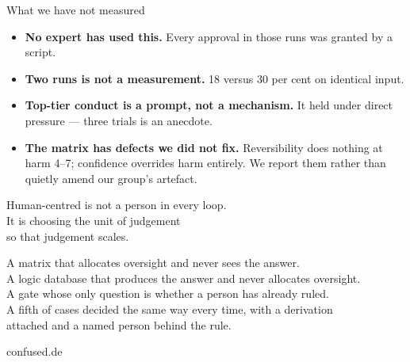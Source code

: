 \documentclass[aspectratio=169,11pt]{beamer}
\begin{document}
\begin{frame}{What we have not measured}
  \vspace{1em}
  \begin{itemize}\setlength\itemsep{.7em}
    \item \textbf{No expert has used this.} Every approval in those runs was
      granted by a script.
    \item \textbf{Two runs is not a measurement.} 18 versus 30 per cent on
      identical input.
    \item \textbf{Top-tier conduct is a prompt, not a mechanism.} It held under
      direct pressure --- three trials is an anecdote.
    \item \textbf{The matrix has defects we did not fix.} Reversibility does
      nothing at harm 4--7; confidence overrides harm entirely. We report them
      rather than quietly amend our group's artefact.
  \end{itemize}
\end{frame}

\begin{frame}[plain]
  \vspace{1.4em}
  \begin{center}
    {\Large Human-centred is not a person in every loop.}\\[.8em]
    {\Large It is choosing the unit of judgement\\so that judgement scales.}
  \end{center}
  \vspace{1.6em}
  \begin{center}\color{muted}
    A matrix that allocates oversight and never sees the answer.\\
    A logic database that produces the answer and never allocates oversight.\\
    A gate whose only question is whether a person has already ruled.\\[1em]
    A fifth of cases decided the same way every time, with a derivation\\
    attached and a named person behind the rule.
  \end{center}
  \vspace{1.4em}
  \begin{center}\ttfamily\small confused.de\end{center}
\end{frame}
\end{document}
